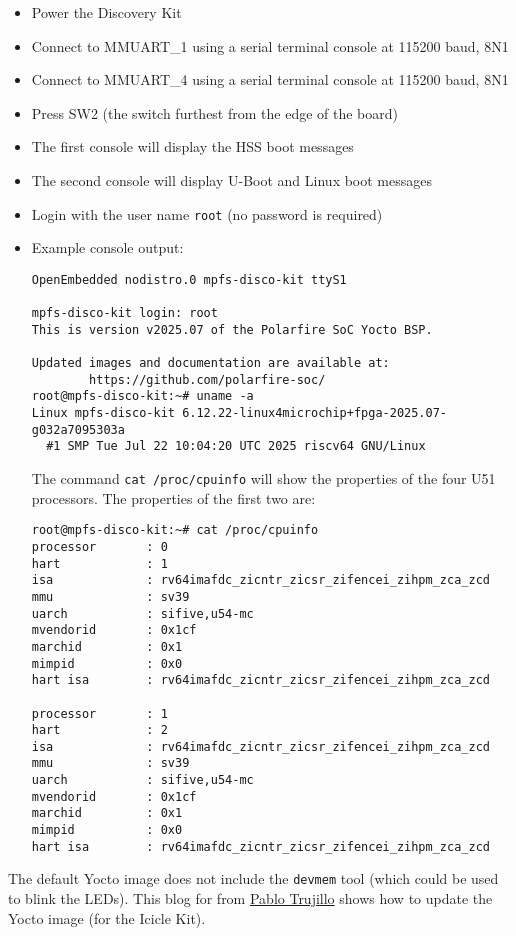 \begin{itemize}
\item Power the Discovery Kit
\item Connect to MMUART\_1 using a serial terminal console at 115200 baud, 8N1
\item Connect to MMUART\_4 using a serial terminal console at 115200 baud, 8N1
\item Press SW2 (the switch furthest from the edge of the board)
\item The first console will display the HSS boot messages
\item The second console will display U-Boot and Linux boot messages
\item Login with the user name \verb+root+ (no password is required)
\item Example console output:

\begin{verbatim}
OpenEmbedded nodistro.0 mpfs-disco-kit ttyS1

mpfs-disco-kit login: root
This is version v2025.07 of the Polarfire SoC Yocto BSP.

Updated images and documentation are available at:
        https://github.com/polarfire-soc/
root@mpfs-disco-kit:~# uname -a
Linux mpfs-disco-kit 6.12.22-linux4microchip+fpga-2025.07-g032a7095303a
  #1 SMP Tue Jul 22 10:04:20 UTC 2025 riscv64 GNU/Linux
\end{verbatim}
%
The command \verb+cat /proc/cpuinfo+ will show the properties of
the four U51 processors. The properties of the first two are:
%
\begin{verbatim}
root@mpfs-disco-kit:~# cat /proc/cpuinfo
processor       : 0
hart            : 1
isa             : rv64imafdc_zicntr_zicsr_zifencei_zihpm_zca_zcd
mmu             : sv39
uarch           : sifive,u54-mc
mvendorid       : 0x1cf
marchid         : 0x1
mimpid          : 0x0
hart isa        : rv64imafdc_zicntr_zicsr_zifencei_zihpm_zca_zcd

processor       : 1
hart            : 2
isa             : rv64imafdc_zicntr_zicsr_zifencei_zihpm_zca_zcd
mmu             : sv39
uarch           : sifive,u54-mc
mvendorid       : 0x1cf
marchid         : 0x1
mimpid          : 0x0
hart isa        : rv64imafdc_zicntr_zicsr_zifencei_zihpm_zca_zcd
\end{verbatim}
\end{itemize}
%
The default Yocto image does not include the \verb+devmem+ tool (which could
be used to blink the LEDs).
%
This blog for from
\href{https://www.controlpaths.com/2021/12/20/getting-started-with-microchips-fpga-icicle-kit-and-polarfire-soc}
{Pablo Trujillo} shows how to update the Yocto image (for the Icicle Kit).

